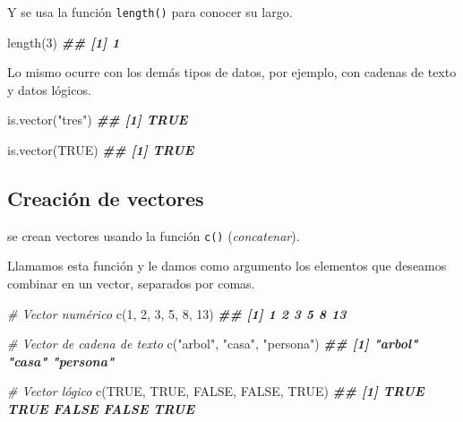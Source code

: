 \documentclass[
]{book}
\newenvironment{Shaded}{\begin{snugshade}}{\end{snugshade}}
\newcommand{\CommentTok}[1]{\textcolor[rgb]{0.56,0.35,0.01}{\textit{#1}}}
\newcommand{\ConstantTok}[1]{\textcolor[rgb]{0.00,0.00,0.00}{#1}}
\newcommand{\DecValTok}[1]{\textcolor[rgb]{0.00,0.00,0.81}{#1}}
\newcommand{\DocumentationTok}[1]{\textcolor[rgb]{0.56,0.35,0.01}{\textbf{\textit{#1}}}}
\newcommand{\FunctionTok}[1]{\textcolor[rgb]{0.00,0.00,0.00}{#1}}
\newcommand{\NormalTok}[1]{#1}
\newcommand{\StringTok}[1]{\textcolor[rgb]{0.31,0.60,0.02}{#1}}
\begin{document}
Y se usa la función \texttt{length()} para conocer su largo.

\begin{Shaded}
\begin{Highlighting}[]
\FunctionTok{length}\NormalTok{(}\DecValTok{3}\NormalTok{)}
\DocumentationTok{\#\# [1] 1}
\end{Highlighting}
\end{Shaded}

Lo mismo ocurre con los demás tipos de datos, por ejemplo, con cadenas de texto y datos lógicos.

\begin{Shaded}
\begin{Highlighting}[]
\FunctionTok{is.vector}\NormalTok{(}\StringTok{"tres"}\NormalTok{)}
\DocumentationTok{\#\# [1] TRUE}

\FunctionTok{is.vector}\NormalTok{(}\ConstantTok{TRUE}\NormalTok{)}
\DocumentationTok{\#\# [1] TRUE}
\end{Highlighting}
\end{Shaded}

\hypertarget{creaciuxf3n-de-vectores}{%
\subsection{Creación de vectores}\label{creaciuxf3n-de-vectores}}

se crean vectores usando la función \texttt{c()} (\emph{concatenar}).

Llamamos esta función y le damos como argumento los elementos que deseamos combinar en un vector, separados por comas.

\begin{Shaded}
\begin{Highlighting}[]
\CommentTok{\# Vector numérico}
\FunctionTok{c}\NormalTok{(}\DecValTok{1}\NormalTok{, }\DecValTok{2}\NormalTok{, }\DecValTok{3}\NormalTok{, }\DecValTok{5}\NormalTok{, }\DecValTok{8}\NormalTok{, }\DecValTok{13}\NormalTok{)}
\DocumentationTok{\#\# [1]  1  2  3  5  8 13}

\CommentTok{\# Vector de cadena de texto}
\FunctionTok{c}\NormalTok{(}\StringTok{"arbol"}\NormalTok{, }\StringTok{"casa"}\NormalTok{, }\StringTok{"persona"}\NormalTok{)}
\DocumentationTok{\#\# [1] "arbol"   "casa"    "persona"}

\CommentTok{\# Vector lógico}
\FunctionTok{c}\NormalTok{(}\ConstantTok{TRUE}\NormalTok{, }\ConstantTok{TRUE}\NormalTok{, }\ConstantTok{FALSE}\NormalTok{, }\ConstantTok{FALSE}\NormalTok{, }\ConstantTok{TRUE}\NormalTok{)}
\DocumentationTok{\#\# [1]  TRUE  TRUE FALSE FALSE  TRUE}
\end{Highlighting}
\end{Shaded}
\end{document}
